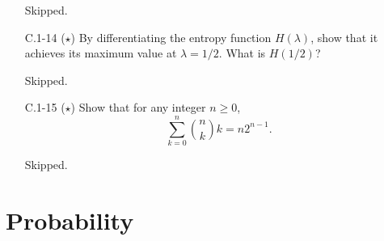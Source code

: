 \begin{enumerate}
\begin{framed}
Skipped.
\end{framed}

\item[C.1{-}14] {($\star$) By differentiating the entropy function $H(\lambda)$,
show that it achieves its maximum value at $\lambda = 1/2$. What is $H(1/2)$?}

\begin{framed}
Skipped.
\end{framed}

\item[C.1{-}15] {($\star$) Show that for any integer $n \ge 0$,
\[
  \sum_{k = 0}^{n} \binom{n}{k} k = n 2^{n - 1}.
\]
}

\begin{framed}
Skipped.
\end{framed}

\end{enumerate}

\newpage

\section{Probability}

